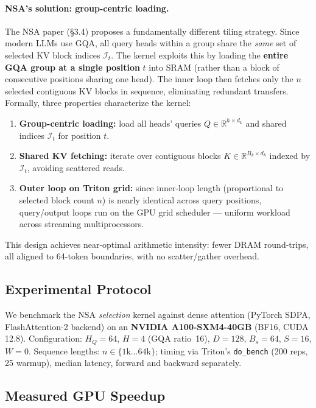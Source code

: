 \documentclass[10pt,twocolumn]{article}
\begin{document}
\paragraph{NSA's solution: group-centric loading.}
The NSA paper (§3.4) proposes a fundamentally different tiling strategy.
Since modern LLMs use GQA, all query heads within a group share the
\emph{same} set of selected KV block indices $\mathcal{I}_t$.
The kernel exploits this by loading the \textbf{entire GQA group at a single position} $t$
into SRAM (rather than a block of consecutive positions sharing one head).
The inner loop then fetches only the $n$ selected contiguous KV blocks in sequence,
eliminating redundant transfers.
Formally, three properties characterize the kernel:
\begin{enumerate}[leftmargin=*,noitemsep,topsep=2pt]
  \item \textbf{Group-centric loading:} load all heads' queries
        $Q \in \mathbb{R}^{h \times d_k}$ and shared indices $\mathcal{I}_t$
        for position $t$.
  \item \textbf{Shared KV fetching:} iterate over contiguous blocks
        $K \in \mathbb{R}^{B_k \times d_k}$ indexed by $\mathcal{I}_t$,
        avoiding scattered reads.
  \item \textbf{Outer loop on Triton grid:} since inner-loop length
        (proportional to selected block count $n$) is nearly identical
        across query positions, query/output loops run on the GPU grid
        scheduler — uniform workload across streaming multiprocessors.
\end{enumerate}
This design achieves near-optimal arithmetic intensity:
fewer DRAM round-trips, all aligned to 64-token boundaries,
with no scatter/gather overhead.

\subsection{Experimental Protocol}

We benchmark the NSA \emph{selection} kernel against dense attention (PyTorch SDPA,
FlashAttention-2 backend) on an \textbf{NVIDIA A100-SXM4-40GB} (BF16, CUDA 12.8).
Configuration: $H_Q=64$, $H=4$ (GQA ratio~16), $D=128$, $B_s=64$, $S=16$, $W=0$.
Sequence lengths: $n \in \{1\text{k}\ldots 64\text{k}\}$; timing via Triton's \texttt{do\_bench}
(200 reps, 25 warmup), median latency, forward and backward separately.

\subsection{Measured GPU Speedup}
\end{document}
